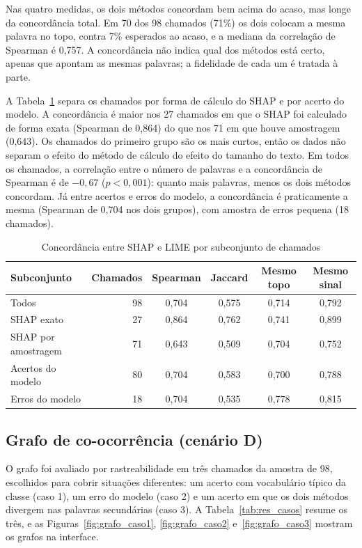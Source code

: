 \documentclass[
    12pt,                %
    openright,           %
    oneside,             %
    a4paper,             %
    english,             %
    brazil               %
]{abntex2}
\begin{document}
Nas quatro medidas, os dois métodos concordam bem acima do acaso, mas longe da concordância total. Em 70 dos 98 chamados (71\%) os dois colocam a mesma palavra no topo, contra 7\% esperados ao acaso, e a mediana da correlação de Spearman é 0,757. A concordância não indica qual dos métodos está certo, apenas que apontam as mesmas palavras; a fidelidade de cada um é tratada à parte.

A Tabela~\ref{tab:res_concordancia_grupos} separa os chamados por forma de cálculo do SHAP e por acerto do modelo. A concordância é maior nos 27 chamados em que o SHAP foi calculado de forma exata (Spearman de 0,864) do que nos 71 em que houve amostragem (0,643). Os chamados do primeiro grupo são os mais curtos, então os dados não separam o efeito do método de cálculo do efeito do tamanho do texto. Em todos os chamados, a correlação entre o número de palavras e a concordância de Spearman é de $-0{,}67$ ($p < 0{,}001$): quanto mais palavras, menos os dois métodos concordam. Já entre acertos e erros do modelo, a concordância é praticamente a mesma (Spearman de 0,704 nos dois grupos), com amostra de erros pequena (18 chamados).

\begin{table}[htb]
  \centering
  \caption{Concordância entre SHAP e LIME por subconjunto de chamados}
  \label{tab:res_concordancia_grupos}
  \small
  \begin{tabular}{lrcccc}
    \toprule
    Subconjunto & Chamados & Spearman & Jaccard & Mesmo topo & Mesmo sinal \\
    \midrule
    Todos & 98 & 0,704 & 0,575 & 0,714 & 0,792 \\
    SHAP exato & 27 & 0,864 & 0,762 & 0,741 & 0,899 \\
    SHAP por amostragem & 71 & 0,643 & 0,509 & 0,704 & 0,752 \\
    Acertos do modelo & 80 & 0,704 & 0,583 & 0,700 & 0,788 \\
    Erros do modelo & 18 & 0,704 & 0,535 & 0,778 & 0,815 \\
    \bottomrule
  \end{tabular}
\end{table}

\subsection{Grafo de co-ocorrência (cenário D)}
O grafo foi avaliado por rastreabilidade em três chamados da amostra de 98, escolhidos para cobrir situações diferentes: um acerto com vocabulário típico da classe (caso 1), um erro do modelo (caso 2) e um acerto em que os dois métodos divergem nas palavras secundárias (caso 3). A Tabela~\ref{tab:res_casos} resume os três, e as Figuras~\ref{fig:grafo_caso1}, \ref{fig:grafo_caso2} e~\ref{fig:grafo_caso3} mostram os grafos na interface.
\end{document}

